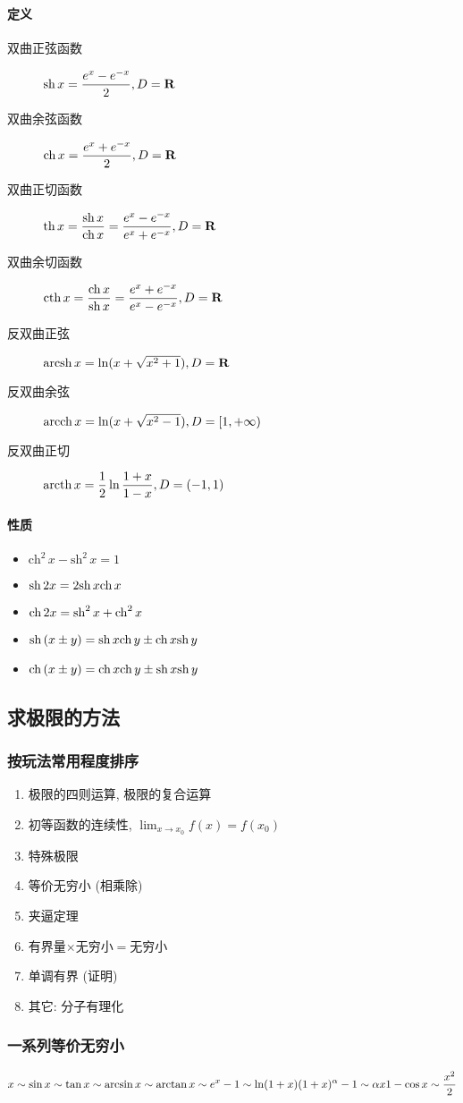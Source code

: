 \paragraph{定义}
\begin{description}
\item[双曲正弦函数] \(\displaystyle \mathrm{sh}\,x=\frac{e^x-e^{-x}}{2},D=\mathbf{R}\)
\item[双曲余弦函数] \(\displaystyle \mathrm{ch}\,x=\frac{e^x+e^{-x}}{2},D=\mathbf{R}\)
\item[双曲正切函数] \(\displaystyle \mathrm{th}\,x=\frac{\mathrm{sh}\,x}{\mathrm{ch}\,x}=\frac{e^x-e^{-x}}{e^x+e^{-x}},D=\mathbf{R}\)
\item[双曲余切函数] \(\displaystyle \mathrm{cth}\,x=\frac{\mathrm{ch}\,x}{\mathrm{sh}\,x}=\frac{e^x+e^{-x}}{e^x-e^{-x}},D=\mathbf{R}\)
\item[反双曲正弦] \(\mathrm{arcsh}\,x=\ln (x+\sqrt{x^2+1}),D=\mathbf{R}\)
\item[反双曲余弦] \(\mathrm{arcch}\,x=\ln (x+\sqrt{x^2-1}),D=[1,+\infty)\)
\item[反双曲正切] \(\displaystyle \mathrm{arcth}\,x=\frac{1}{2}\ln \frac{1+x}{1-x},D=(-1,1)\)
\end{description}

\paragraph{性质}
\begin{itemize}
\item \(\mathrm{ch}^2\,x-\mathrm{sh}^2\,x=1\)
\item \(\mathrm{sh}\,2x=2\mathrm{sh}\,x\mathrm{ch}\,x\)
\item \(\mathrm{ch}\,2x=\mathrm{sh}^2\,x+\mathrm{ch}^2\,x\)
\item \(\mathrm{sh}\,(x\pm y)=\mathrm{sh}\,x\mathrm{ch}\,y\pm \mathrm{ch}\,x\mathrm{sh}\,y\)
\item \(\mathrm{ch}\,(x\pm y)=\mathrm{ch}\,x\mathrm{ch}\,y\pm \mathrm{sh}\,x\mathrm{sh}\,y\)
\end{itemize}

\subsection{求极限的方法}
\subsubsection{按玩法常用程度排序}
\begin{enumerate}
\item 极限的四则运算, 极限的复合运算
\item 初等函数的连续性, \(\displaystyle\lim_{x\to x_0}f(x)=f(x_0)\)
\item 特殊极限
\item 等价无穷小 (相乘除)
\item 夹逼定理
\item 有界量\(\times\)无穷小\(=\)无穷小
\item 单调有界 (证明)
\item 其它: 分子有理化
\end{enumerate}

\subsubsection{一系列等价无穷小}
\(\displaystyle x\sim\sin x\sim\tan x\sim\arcsin x\sim\arctan x\sim e^x-1\sim\ln(1+x)\\
(1+x)^\alpha-1\sim\alpha x\\
1-\cos x\sim\frac{x^2}{2}\)
